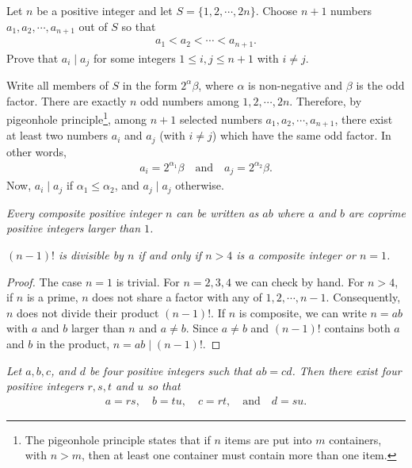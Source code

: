 \documentclass{subfile}
\begin{document}
	\begin{problem}
		Let $n$ be a positive integer and let $S=\{1,2,\cdots,2n\}$. Choose $n+1$ numbers $a_1,a_2,\cdots, a_{n+1}$ out of $S$ so that
		\begin{align*}
			a_1<a_2<\cdots <a_{n+1}.
		\end{align*}
		Prove that $a_i\mid a_j$ for some integers $1 \leq i,j \leq n+1$ with $i\neq j$.
	\end{problem}

	\begin{solution}
		Write all members of $S$ in the form $2^{\alpha}\beta$, where $\alpha$ is non-negative and $\beta$ is the odd factor. There are exactly $n$ odd numbers among $1,2,\cdots,2n$. Therefore, by pigeonhole principle\footnote{The pigeonhole principle states that if $n$ items are put into $m$ containers, with $n > m$, then at least one container must contain more than one item.}, among $n+1$ selected numbers $a_1,a_2,\cdots, a_{n+1}$, there exist at least two numbers $a_i$ and $a_j$ (with $i\neq j$) which have the same odd factor. In other words,
		\begin{align*}
			a_i = 2^{\alpha_1}\beta \quad \text{and} \quad a_j = 2^{\alpha_2}\beta.
		\end{align*}
		Now, $a_i\mid a_j$ if $\alpha_1\leq \alpha_2$, and $a_j\mid a_j$ otherwise.
	\end{solution}

	\begin{theorem}\slshape
		Every composite positive integer $n$ can be written as $ab$ where $a$ and $b$ are coprime positive integers larger than $1$.
	\end{theorem}

	\begin{theorem}\slshape
		$(n-1)!$ is divisible by $n$ if and only if $n>4$ is a composite integer or $n=1$.\label{thm:cpfct}
	\end{theorem}

	\begin{proof}
		The case $n=1$ is trivial. For $n=2,3,4$ we can check by hand. For $n>4$, if $n$ is a prime, $n$ does not share a factor with any of $1,2,\cdots,n-1$. Consequently, $n$ does not divide their product $(n-1)!$. If $n$ is composite, we can write $n=ab$ with $a$ and $b$ larger than $n$ and $a\neq b$. Since $a\neq b$ and $(n-1)!$ contains both $a$ and $b$ in the product, $n=ab\mid (n-1)!$.
	\end{proof}

	\begin{theorem}\slshape
		Let $a, b, c$, and $d$ be four positive integers such that $ab=cd$. Then there exist four positive integers $r,s,t$ and $u$ so that
		\begin{align*}
			a = rs, \quad b = tu, \quad	c = rt, \quad \text{and}\quad d = su.
		\end{align*}
	\end{theorem}
\end{document}
